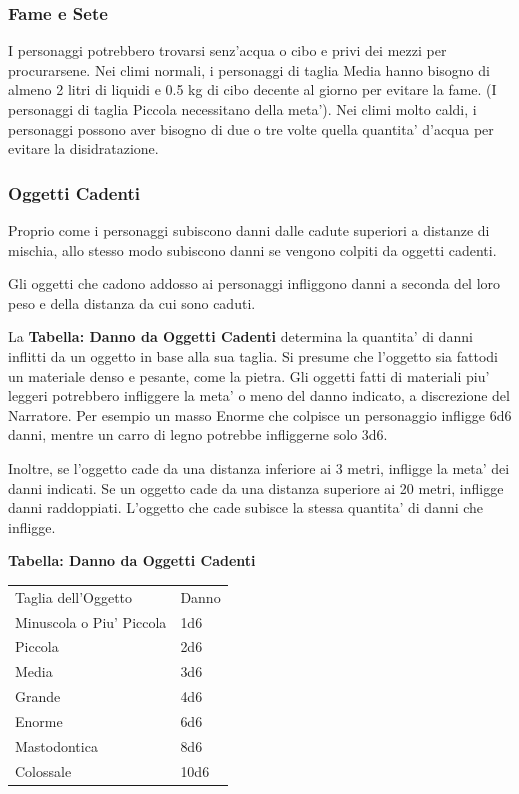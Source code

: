 \documentclass[a4paper,11pt,twoside,openany]{dndbook}
\begin{document}
{\subsubsection{Fame e Sete}

\label{fame-e-sete}

I personaggi potrebbero trovarsi senz'acqua o cibo e privi dei mezzi per procurarsene. Nei climi normali, i personaggi di taglia Media hanno bisogno di almeno 2 litri di liquidi e 0.5 kg di cibo decente al giorno per evitare la fame. (I personaggi di taglia Piccola necessitano della meta'). Nei climi molto caldi, i personaggi possono aver bisogno di due o tre volte quella quantita' d'acqua per evitare la disidratazione.

\subsubsection{Oggetti Cadenti}

\label{oggetti-cadenti}

Proprio come i personaggi subiscono danni dalle cadute superiori a distanze di mischia, allo stesso modo subiscono danni se vengono colpiti da oggetti cadenti.

Gli oggetti che cadono addosso ai personaggi infliggono danni a seconda del loro peso e della distanza da cui sono caduti.

La \textbf{Tabella: Danno da Oggetti Cadenti} determina la quantita' di danni inflitti da un oggetto in base alla sua taglia. Si presume che l'oggetto sia fattodi un materiale denso e pesante, come la pietra. 
Gli oggetti fatti di materiali piu' leggeri potrebbero infliggere la meta' o meno del danno indicato, a discrezione del Narratore. Per esempio un masso Enorme che colpisce un personaggio infligge 6d6 danni, mentre un carro di legno potrebbe infliggerne solo 3d6.

Inoltre, se l'oggetto cade da una distanza inferiore ai 3 metri, infligge la meta' dei danni indicati. Se un oggetto cade da una distanza superiore ai 20 metri, infligge danni raddoppiati. L'oggetto che cade subisce la stessa quantita' di danni che infligge.

\bigskip

\textbf{Tabella: Danno da Oggetti Cadenti}

\begin{tabular}[c]{@{}ll@{}}
\toprule 
Taglia dell'Oggetto & Danno\tabularnewline
Minuscola o Piu' Piccola & 1d6\tabularnewline
Piccola & 2d6\tabularnewline
Media & 3d6\tabularnewline
Grande & 4d6\tabularnewline
Enorme & 6d6\tabularnewline
Mastodontica & 8d6\tabularnewline
Colossale & 10d6\tabularnewline
\bottomrule
\end{tabular}

}
\end{document}
